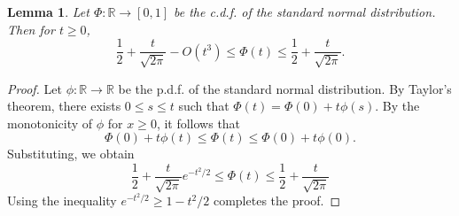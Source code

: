 \documentclass{article}
\newtheorem{lemma}[theorem]{Lemma}
\theoremstyle{remark}
\newcommand{\R}{\mathbb{R}}
\newcommand{\1}{\mathbbm{1}}
\begin{document}
\begin{lemma}\label{lemma:normalapprox}
    Let $\Phi \colon \R \to [0, 1]$ be the c.d.f. of the standard normal distribution. Then for $t \ge 0$,
    \[\frac{1}{2} + \frac{t}{\sqrt{2\pi}} - O(t^3) \le \Phi(t) \le \frac{1}{2} + \frac{t}{\sqrt{2\pi}}.\]
\end{lemma}
\begin{proof}
    Let $\phi \colon \R \to \R$ be the p.d.f. of the standard normal distribution. By Taylor's theorem, there exists $0 \le s \le t$ such that $\Phi(t) = \Phi(0) + t \phi(s)$.
    By the monotonicity of $\phi$ for $x \ge 0$, it follows that
    \[\Phi(0) + t \phi(t) \le \Phi(t) \le \Phi(0) + t \phi(0).\]
    Substituting, we obtain
    \[\frac{1}{2} + \frac{t}{\sqrt{2\pi}} e^{-t^2 / 2} \le \Phi(t) \le \frac{1}{2} + \frac{t}{\sqrt{2\pi}}\]
    Using the inequality $e^{-t^2 / 2} \ge 1 - t^2 / 2$ completes the proof.
\end{proof}
\end{document}
